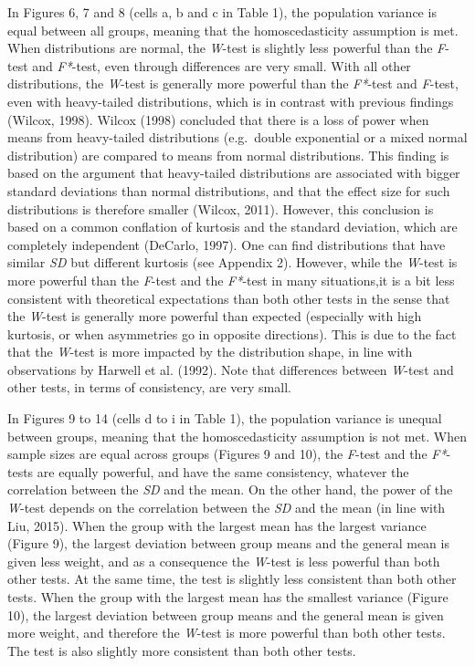 \documentclass[man,floatsintext]{apa6}
\begin{document}
In Figures 6, 7 and 8 (cells a, b and c in Table 1), the population variance is equal between all groups, meaning that the homoscedasticity assumption is met. When distributions are normal, the \emph{W}-test is slightly less powerful than the \emph{F}-test and \emph{F*}-test, even through differences are very small. With all other distributions, the \emph{W}-test is generally more powerful than the \emph{F*}-test and \emph{F}-test, even with heavy-tailed distributions, which is in contrast with previous findings (Wilcox, 1998). Wilcox (1998) concluded that there is a loss of power when means from heavy-tailed distributions (e.g.~double exponential or a mixed normal distribution) are compared to means from normal distributions. This finding is based on the argument that heavy-tailed distributions are associated with bigger standard deviations than normal distributions, and that the effect size for such distributions is therefore smaller (Wilcox, 2011). However, this conclusion is based on a common conflation of kurtosis and the standard deviation, which are completely independent (DeCarlo, 1997). One can find distributions that have similar \emph{SD} but different kurtosis (see Appendix 2). However, while the \emph{W}-test is more powerful than the \emph{F}-test and the \emph{F*}-test in many situations,it is a bit less consistent with theoretical expectations than both other tests in the sense that the \emph{W}-test is generally more powerful than expected (especially with high kurtosis, or when asymmetries go in opposite directions). This is due to the fact that the \emph{W}-test is more impacted by the distribution shape, in line with observations by Harwell et al. (1992). Note that differences between \emph{W}-test and other tests, in terms of consistency, are very small.

In Figures 9 to 14 (cells d to i in Table 1), the population variance is unequal between groups, meaning that the homoscedasticity assumption is not met. When sample sizes are equal across groups (Figures 9 and 10), the \emph{F}-test and the \emph{F*}-tests are equally powerful, and have the same consistency, whatever the correlation between the \emph{SD} and the mean. On the other hand, the power of the \emph{W}-test depends on the correlation between the \emph{SD} and the mean (in line with Liu, 2015). When the group with the largest mean has the largest variance (Figure 9), the largest deviation between group means and the general mean is given less weight, and as a consequence the \emph{W}-test is less powerful than both other tests. At the same time, the test is slightly less consistent than both other tests. When the group with the largest mean has the smallest variance (Figure 10), the largest deviation between group means and the general mean is given more weight, and therefore the \emph{W}-test is more powerful than both other tests. The test is also slightly more consistent than both other tests.
\end{document}
